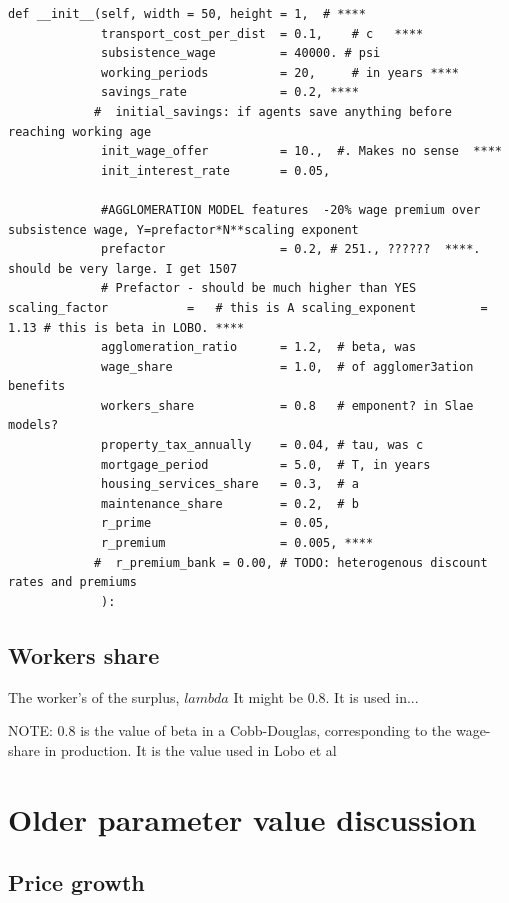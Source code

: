 \begin{lstlisting}
def __init__(self, width = 50, height = 1,  # ****
             transport_cost_per_dist  = 0.1,    # c   ****
             subsistence_wage         = 40000. # psi
             working_periods          = 20,     # in years ****
             savings_rate             = 0.2, ****
            #  initial_savings: if agents save anything before reaching working age
             init_wage_offer          = 10.,  #. Makes no sense  ****
             init_interest_rate       = 0.05,

             #AGGLOMERATION MODEL features  -20% wage premium over subsistence wage, Y=prefactor*N**scaling exponent
             prefactor                = 0.2, # 251., ??????  ****. should be very large. I get 1507 
             # Prefactor - should be much higher than YES scaling_factor           =   # this is A scaling_exponent         =  1.13 # this is beta in LOBO. ****
             agglomeration_ratio      = 1.2,  # beta, was 
             wage_share               = 1.0,  # of agglomer3ation benefits
             workers_share            = 0.8   # emponent? in Slae models?
             property_tax_annually    = 0.04, # tau, was c
             mortgage_period          = 5.0,  # T, in years
             housing_services_share   = 0.3,  # a
             maintenance_share        = 0.2,  # b
             r_prime                  = 0.05,
             r_premium                = 0.005, ****
            #  r_premium_bank = 0.00, # TODO: heterogenous discount rates and premiums
             ):
\end{lstlisting}

\subsection{Workers share}
The worker's of the surplus, $lambda$ It might be 0.8. It is used in...

NOTE: 0.8 is the value of beta in a Cobb-Douglas, corresponding to the wage-share in production. It is the value used in Lobo et al


\section{Older parameter value discussion}

\subsection{Price growth}


